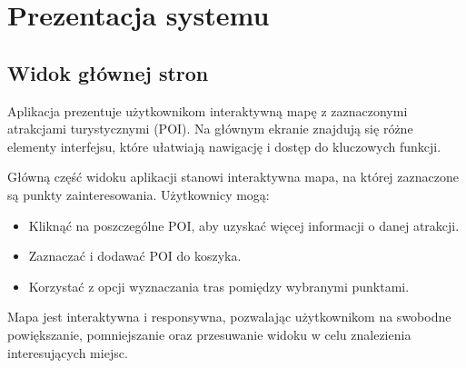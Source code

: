 
\chapter{Prezentacja systemu}
\label{ch:prezentacja-systemu}



\section{Widok głównej stron}
\label{sec:mapawidok}

Aplikacja prezentuje użytkownikom interaktywną mapę z zaznaczonymi atrakcjami turystycznymi (POI). 
Na głównym ekranie znajdują się różne elementy interfejsu, które ułatwiają nawigację i dostęp do kluczowych funkcji.

Główną część widoku aplikacji stanowi interaktywna mapa, na której zaznaczone są punkty zainteresowania. Użytkownicy mogą:
\begin{itemize}
 \item   Kliknąć na poszczególne POI, aby uzyskać więcej informacji o danej atrakcji.
 \item   Zaznaczać i dodawać POI do koszyka.
 \item  Korzystać z opcji wyznaczania tras pomiędzy wybranymi punktami.
\end{itemize}
Mapa jest interaktywna i responsywna, pozwalając użytkownikom na swobodne powiększanie, pomniejszanie oraz przesuwanie widoku w celu znalezienia interesujących miejsc.

